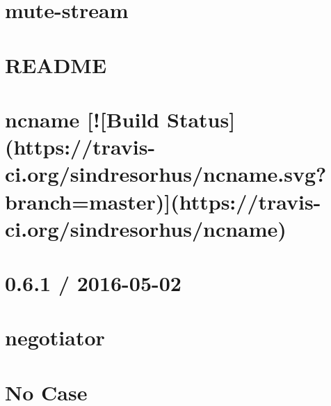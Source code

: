 \documentclass[twoside]{book}
\newcommand{\+}{\discretionary{\mbox{\scriptsize$\hookleftarrow$}}{}{}}
\begin{document}
\chapter{mute-\/stream}
\label{md__c_1_workspace_demo_src_main_script_node_modules_mute-stream__r_e_a_d_m_e}

\chapter{R\+E\+A\+D\+ME}
\label{md__c_1_workspace_demo_src_main_script_node_modules_natural-compare__r_e_a_d_m_e}

\chapter{ncname \mbox{[}!\mbox{[}Build Status\mbox{]}(https\+://travis-\/ci.org/sindresorhus/ncname.svg?branch=master)\mbox{]}(https\+://travis-\/ci.org/sindresorhus/ncname)}
\label{md__c_1_workspace_demo_src_main_script_node_modules_ncname_readme}

\chapter{0.6.1 / 2016-\/05-\/02}
\label{md__c_1_workspace_demo_src_main_script_node_modules_negotiator__h_i_s_t_o_r_y}

\chapter{negotiator}
\label{md__c_1_workspace_demo_src_main_script_node_modules_negotiator__r_e_a_d_m_e}

\chapter{No Case}
\label{md__c_1_workspace_demo_src_main_script_node_modules_no-case__r_e_a_d_m_e}

\end{document}
